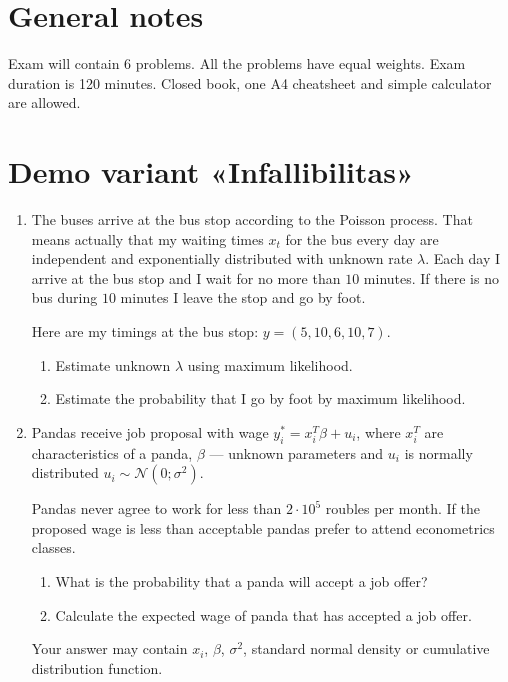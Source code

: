 \documentclass[12pt]{article}
\newcommand \cN{\mathcal{N}}
\begin{document}
\section*{General notes}

Exam will contain 6 problems. 
All the problems have equal weights. 
Exam duration is 120 minutes. 
Closed book, one A4 cheatsheet and simple calculator are allowed.

\section*{Demo variant «Infallibilitas»}
\begin{enumerate}
    \item The buses arrive at the bus stop according to the Poisson process. 
    That means actually that my waiting times $x_t$ for the bus every day are independent and exponentially distributed with unknown rate $\lambda$.
    Each day I arrive at the bus stop and I wait for no more than $10$ minutes. 
    If there is no bus during $10$ minutes I leave the stop and go by foot. 

    Here are my timings at the bus stop: $y = (5, 10, 6, 10, 7)$.

    \begin{enumerate}
        \item Estimate unknown $\lambda$ using maximum likelihood. 
        \item Estimate the probability that I go by foot by maximum likelihood. 
    \end{enumerate}
    
    \item Pandas receive job proposal with wage $y_i^* = x_i^T \beta + u_i$, where $x_i^T$ are characteristics of a panda, 
    $\beta$ — unknown parameters and $u_i$ is normally distributed $u_i \sim \cN(0; \sigma^2)$.

    Pandas never agree to work for less than $2\cdot 10^5$ roubles per month. 
    If the proposed wage is less than acceptable pandas prefer to attend econometrics classes. 

    \begin{enumerate}
        \item What is the probability that a panda will accept a job offer?
        \item Calculate the expected wage of  panda that has accepted a job offer. 
    \end{enumerate}

    Your answer may contain  $x_i$, $\beta$, $\sigma^2$, standard normal density or cumulative distribution function.
    


\end{enumerate}
\end{document}
